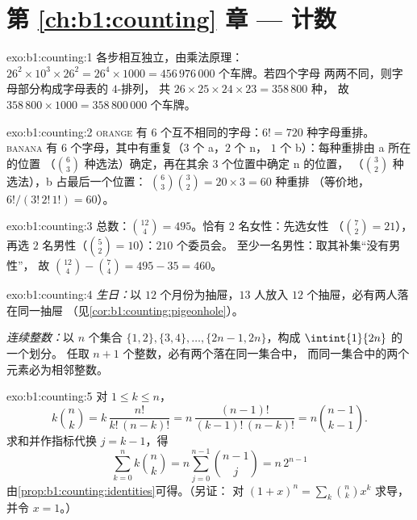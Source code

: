 \section*{第 \ref{ch:b1:counting} 章 --- 计数}

\begin{solution}{exo:b1:counting:1}
各步相互独立，由乘法原理：$26^2 \times 10^3 \times 26^2
= 26^4 \times 1000 = 456\,976\,000$ 个车牌。若四个字母
两两不同，则字母部分构成字母表的 $4$-排列，
共 $26 \times 25 \times 24 \times 23 = 358\,800$ 种，
故 $358\,800 \times 1000 = 358\,800\,000$ 个车牌。
\end{solution}

\begin{solution}{exo:b1:counting:2}
\textsc{orange} 有 $6$ 个互不相同的字母：$6! = 720$ 种字母重排。
\textsc{banana} 有 $6$ 个字母，其中有重复（$3$ 个 a，$2$ 个 n，
$1$ 个 b）：每种重排由 a 所在的位置
（$\binom 63$ 种选法）确定，再在其余 $3$ 个位置中确定 n 的位置，
（$\binom 32$ 种选法），b 占最后一个位置：
$\binom{6}{3}\binom{3}{2} = 20 \times 3 = 60$ 种重排
（等价地，$6!/(3!\,2!\,1!) = 60$）。
\end{solution}

\begin{solution}{exo:b1:counting:3}
总数：$\binom{12}{4} = 495$。恰有 $2$ 名女性：先选女性
（$\binom 72 = 21$），再选 $2$ 名男性（$\binom 52 = 10$）：$210$ 个委员会。
至少一名男性：取其补集“没有男性”，
故 $\binom{12}{4} - \binom{7}{4} = 495 - 35 = 460$。
\end{solution}

\begin{solution}{exo:b1:counting:4}
\emph{生日：}以 $12$ 个月份为抽屉，$13$ 人放入 $12$
个抽屉，必有两人落在同一抽屉
（见\cref{cor:b1:counting:pigeonhole}）。

\emph{连续整数：}以 $n$ 个集合 $\{1,2\},
\{3,4\}, \dots, \{2n-1, 2n\}$，构成 $\intint{1}{2n}$ 的一个划分。
任取 $n + 1$ 个整数，必有两个落在同一集合中，
而同一集合中的两个元素必为相邻整数。
\end{solution}

\begin{solution}{exo:b1:counting:5}
对 $1 \leq k \leq n$，
\[
k \binom nk = k\,\frac{n!}{k!\,(n-k)!}
= n\,\frac{(n-1)!}{(k-1)!\,(n-k)!} = n \binom{n-1}{k-1}.
\]
求和并作指标代换 $j = k - 1$，得
\[
\sum_{k=0}^{n} k \binom nk = n \sum_{j=0}^{n-1} \binom{n-1}{j}
= n\, 2^{n-1}
\]
由\cref{prop:b1:counting:identities}可得。（另证：
对 $(1+x)^n = \sum_k \binom nk x^k$ 求导，并令 $x = 1$。）
\end{solution}

